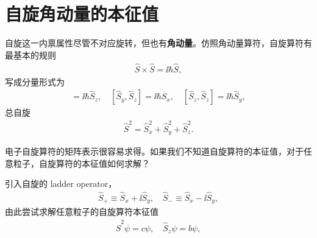 
\section{自旋角动量的本征值}
自旋这一内禀属性尽管不对应旋转，但也有\textbf{角动量}。仿照角动量算符，自旋算符有最基本的规则
\begin{align}
    \hat S \times \hat S = \ii \hbar \hat S,
\end{align}
写成分量形式为
\begin{align}
[\hat S_x, \hat S_y] = \ii\hbar \hat S_z, \quad
[\hat S_y, \hat S_z] = \ii\hbar \hat S_x, \quad
[\hat S_z, \hat S_z] = \ii\hbar \hat S_y,
\label{eq:spin_bb_2}
\end{align}
总自旋
\begin{align}
    \hat S^2 = \hat S_x^2 + \hat S_y^2 + \hat S_z^2. 
    \label{eq:spin_bb_1}
\end{align}

电子自旋算符的矩阵表示很容易求得。如果我们不知道自旋算符的本征值，对于任意粒子，自旋算符的本征值如何求解？

引入自旋的 ladder operator，
\begin{align}
    \hat S_+ \equiv \hat S_x + \ii \hat S_y, \quad \hat S_- \equiv \hat S_x - \ii \hat S_y, 
    \label{eq:spin_bb_4}
\end{align}
由此尝试求解任意粒子的自旋算符本征值
\begin{align}
    \hat S^2 \psi = c \psi, \quad \hat S_z \psi = b \psi, 
    \label{eq:spin_bb_10}
\end{align}

